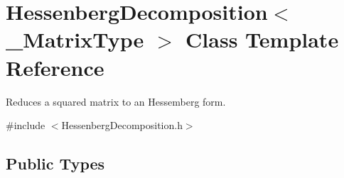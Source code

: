 \hypertarget{class_hessenberg_decomposition}{\section{Hessenberg\-Decomposition$<$ \-\_\-\-Matrix\-Type $>$ Class Template Reference}
\label{class_hessenberg_decomposition}
}


Reduces a squared matrix to an Hessemberg form.  




{\ttfamily \#include $<$Hessenberg\-Decomposition.\-h$>$}

\subsection*{Public Types}
